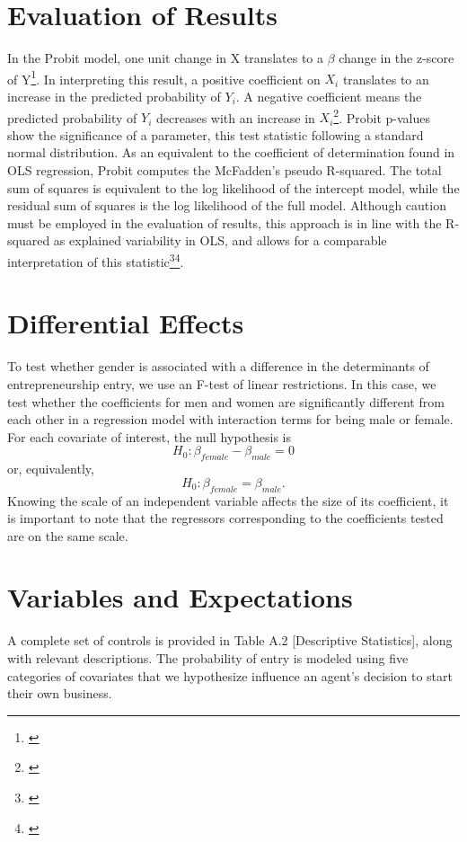 \section{Evaluation of Results}

In the Probit model, one unit change in X translates to a $\beta$ change in the z-score of Y\footnote{\cite{AldrichNelson1984}}. In interpreting this result, a positive coefficient on $X_i$ translates to an increase in the predicted probability of $Y_i$. A negative coefficient means the predicted probability of $Y_i$ decreases with an increase in $X_i$\footnote{\cite{AldrichNelson1984}}. Probit p-values show the significance of a parameter, this test statistic following a standard normal distribution. As an equivalent to the coefficient of determination found in OLS regression, Probit computes the McFadden's pseudo R-squared. The total sum of squares is equivalent to the log likelihood of the intercept model, while the residual sum of squares is the log likelihood of the full model. Although caution must be employed in the evaluation of results, this approach is in line with the R-squared as explained variability in OLS, and allows for a comparable interpretation of this statistic\footnote{\cite{Hilbe1996}}\hspace{.2em}\footnote{\cite{Long1997}}. 

\section{Differential Effects}

To test whether gender is associated with a difference in the determinants of entrepreneurship entry, we use an F-test of linear restrictions. In this case, we test whether the coefficients for men and women are significantly different from each other in a regression model with interaction terms for being male or female. For each covariate of interest, the null hypothesis is $$H_0 : \beta_{female} - \beta_{male} = 0$$ or, equivalently, $$H_0 : \beta_{female} = \beta_{male}.$$ Knowing the scale of an independent variable affects the size of its coefficient, it is important to note that the regressors corresponding to the coefficients tested are on the same scale. 


\section{Variables and Expectations}

A complete set of controls is provided in Table A.2 [Descriptive Statistics], along with relevant descriptions. The probability of entry is modeled using five categories of covariates that we hypothesize influence an agent's decision to start their own business. 

